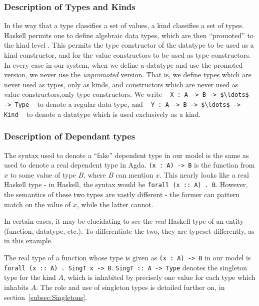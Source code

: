 \noindent
\subsubsection*{Description of Types and Kinds}

In the way that a type classifies a set of values, a kind classifies a set of
types. Haskell permits one to define algebraic data types, which are then 
``promoted''
to the kind level \citep{promotion}. 
This permits the type constructor of the datatype to be used
as a kind constructor, and for the value constructors to be used as type 
constructors. In every case in our system, when we define a datatype and use 
the promoted version, we never use the \emph{unpromoted} version. That is, we 
define types which are never used as types, only as kinds, and constructors 
which are never used as value constructors,only type constructors. We write 
\,\,\,
\lstinline!X : A -> B -> $\ldots$ -> Type!
\,\,\, 
to denote a regular data type, and 
\,\,\,
\lstinline!Y : A -> B -> $\ldots$ -> Kind!
\,\,\, 
to denote a datatype
which is used exclusively as a kind. 

\noindent
\subsubsection*{Description of Dependant types}

The syntax used to denote a ``fake'' dependent type in our model is the same 
as used to denote a real dependent type in Agda. \lstinline!(x : A) -> B! is 
the function
from $x$ to some value of type $B$, where $B$ can mention $x$. This nearly 
looks like a 
real Haskell type - in Haskell, the syntax would be \texttt{forall (x :: A) . 
B}. However, 
the semantics of these two types are vastly different - the former can pattern 
match
on the value of $x$, while the latter cannot. 

In certain cases, it may be elucidating to see the \emph{real} Haskell type of
an entity (function, datatype, etc.). To differentiate the two, they are typeset
differently, as in this example.

The real type of a function whose type is given as \lstinline!(x : A) -> B! in
our model is \texttt{forall (x :: A) . SingT x -> B}. \texttt{SingT :: A -> 
Type}
denotes the singleton type for the kind $A$, which is inhabited by precisely
one value for each type which inhabits $A$. The role and use of singleton types
is detailed further on, in section~\ref{subsec:Singletons}. 

